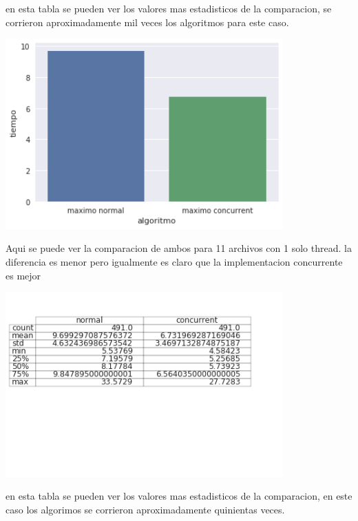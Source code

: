 en esta tabla se pueden ver los valores mas estadisticos de la comparacion, se
corrieron aproximadamente mil veces los algoritmos para este caso.


\begin{center}
\includegraphics[width=0.8\textwidth]{imagenes/maxvsmax1thread.png}
\end{center}

Aqui se puede ver la comparacion de ambos para 11 archivos con 1 solo thread. la diferencia es menor
pero igualmente es claro que la implementacion concurrente es mejor

\begin{center}
\includegraphics[width=0.8\textwidth]{imagenes/descplot2.png}
\end{center}

en esta tabla se pueden ver los valores mas estadisticos de la comparacion, en este caso
los algorimos se corrieron aproximadamente quinientas veces.
